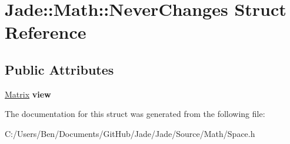 \hypertarget{struct_jade_1_1_math_1_1_never_changes}{}\section{Jade\+:\+:Math\+:\+:Never\+Changes Struct Reference}
\label{struct_jade_1_1_math_1_1_never_changes}
\subsection*{Public Attributes}
\begin{DoxyCompactItemize}
\item 
\hypertarget{struct_jade_1_1_math_1_1_never_changes_a5908973be46b89c468e79e58970a15f0}{}\hyperlink{struct_jade_1_1_math_1_1_matrix}{Matrix} {\bfseries view}\label{struct_jade_1_1_math_1_1_never_changes_a5908973be46b89c468e79e58970a15f0}

\end{DoxyCompactItemize}


The documentation for this struct was generated from the following file\+:\begin{DoxyCompactItemize}
\item 
C\+:/\+Users/\+Ben/\+Documents/\+Git\+Hub/\+Jade/\+Jade/\+Source/\+Math/Space.\+h\end{DoxyCompactItemize}

